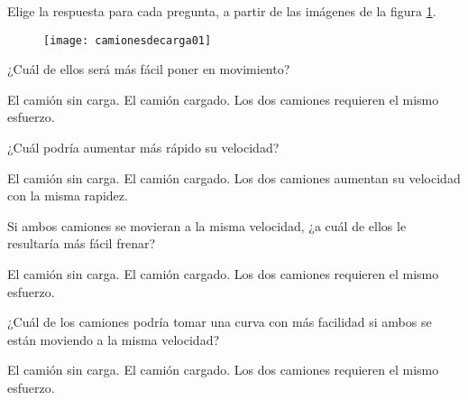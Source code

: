 Elige la respuesta para cada pregunta, a partir de las imágenes de la figura \ref{fig:cerditos}.

\begin{multicols}{2}
    \begin{parts}

        \begin{figure}[H]
            \centering
            \texttt{[image: camionesdecarga01]}
            \label{fig:cerditos}
        \end{figure}

        ¿Cuál de ellos será más fácil poner en movimiento?

        \begin{choices}
            \choice El camión sin carga.
            \choice El camión cargado.
            \choice Los dos camiones requieren el mismo esfuerzo.
        \end{choices}


        ¿Cuál podría aumentar más rápido su velocidad?
        \begin{choices}
            \choice El camión sin carga.
            \choice El camión cargado.
            \choice Los dos camiones aumentan su velocidad con la misma rapidez.
        \end{choices}


        Si ambos camiones se movieran a la misma velocidad,
        ¿a cuál de ellos le resultaría más fácil frenar?

        \begin{choices}
            \choice El camión sin carga.
            \choice El camión cargado.
            \choice Los dos camiones requieren el mismo esfuerzo.
        \end{choices}

        ¿Cuál de los camiones podría tomar una curva con más
        facilidad si ambos se están moviendo a la misma velocidad?

        \begin{choices}
            \choice El camión sin carga.
            \choice El camión cargado.
            \choice Los dos camiones requieren el mismo esfuerzo.
        \end{choices}



\end{parts}
\end{multicols}
